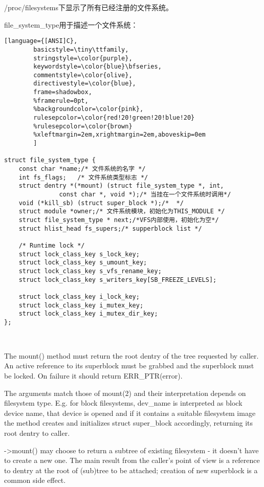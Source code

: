 /proc/filesystems下显示了所有已经注册的文件系统。




	file\_system\_type用于描述一个文件系统：

\begin{lstlisting}[language={[ANSI]C},
        basicstyle=\tiny\ttfamily,
        stringstyle=\color{purple},
        keywordstyle=\color{blue}\bfseries,
        commentstyle=\color{olive},
        directivestyle=\color{blue},
        frame=shadowbox,
        %framerule=0pt,
        %backgroundcolor=\color{pink},
        rulesepcolor=\color{red!20!green!20!blue!20}
        %rulesepcolor=\color{brown}
        %xleftmargin=2em,xrightmargin=2em,aboveskip=0em
        ]
        
struct file_system_type {
	const char *name;/* 文件系统的名字 */
	int fs_flags;	/* 文件系统类型标志 */
	struct dentry *(*mount) (struct file_system_type *, int,
		       const char *, void *);/* 当挂在一个文件系统时调用*/
	void (*kill_sb) (struct super_block *);/*  */
	struct module *owner;/* 文件系统模块，初始化为THIS_MODULE */
	struct file_system_type * next;/*VFS内部使用，初始化为空*/
	struct hlist_head fs_supers;/* supperblock list */

	/* Runtime lock */
	struct lock_class_key s_lock_key;
	struct lock_class_key s_umount_key;
	struct lock_class_key s_vfs_rename_key;
	struct lock_class_key s_writers_key[SB_FREEZE_LEVELS];

	struct lock_class_key i_lock_key;
	struct lock_class_key i_mutex_key;
	struct lock_class_key i_mutex_dir_key;
};
        
        
\end{lstlisting}


 The mount() method must return the root dentry of the tree requested by
 caller.  An active reference to its superblock must be grabbed and the
 superblock must be locked.  On failure it should return ERR\_PTR(error).
 
 The arguments match those of mount(2) and their interpretation
 depends on filesystem type.  E.g. for block filesystems, dev\_name is
 interpreted as block device name, that device is opened and if it
 contains a suitable filesystem image the method creates and initializes
 struct super\_block accordingly, returning its root dentry to caller.
 
 ->mount() may choose to return a subtree of existing filesystem - it
 doesn't have to create a new one.  The main result from the caller's
 point of view is a reference to dentry at the root of (sub)tree to
 be attached; creation of new superblock is a common side effect.
 
